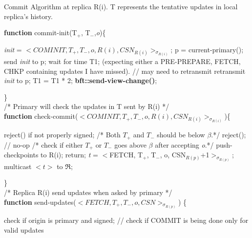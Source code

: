 \documentclass[twocolumn,10pt]{article}
\begin{document}
{\begin{algorithm}

\caption{Commit Algorithm at replica R(i). T represents the tentative updates in local
replica's history.}

\textbf{function} commit-init(T$_{+}$, T$_{-}$,\textit{o})\{
\begin{algorithmic}[1]
\STATE \textit{init} = 
$<COMINIT, T_{+}, T_{-}, o,R(i), CSN_{R(i)}>_{\sigma_{R(i)}}$;
\STATE p = current-primary();
\STATE send \textit{init} to p;
\STATE wait for time T1; (expecting either a PRE-PREPARE, FETCH, CHKP containing
updates I have missed). // may need to retransmit
\STATE retransmit \textit{init} to p;
\STATE T1 = T1 * 2;
\ENDFOR
{}
\STATE \textbf{bft::send-view-change()};
\ENDIF
\end{algorithmic}
\}\\
/* Primary will check the updates in T sent by R(i) */\\
\textbf{function} check-commit($<COMINIT, T_{+}, T_{-}, o, R(i), CSN_{R(i)}>_{\sigma_{R(i)}}$)\{
\begin{algorithmic}[1]
\STATE reject() if not properly signed;
\STATE /* Both $T_{+}$ and $T_{-}$ should be below $\beta$.*/
\STATE reject(); // no-op
\ENDIF
\STATE /* check if either $T_{+}$ or $T_{-}$ goes above $\beta$ after accepting \textit{o}.*/
\STATE push-checkpoints to R(i);
\STATE return;
\ENDIF
\STATE \textit{t} = $<$FETCH, T$_{+}$, T$_{-}$, o, CSN$_{R(p)}$+1$>_{\sigma_{R(p)}}$;
\STATE multicast $<t>$ to $\Re$;
\ENDIF
\end{algorithmic}
\}\\
/* Replica R(i) send updates when asked by primary */\\
\textbf{function} send-updates($<FETCH, T_+, T_-, o,
CSN >_{\sigma_{R(p)}}$) \{
\begin{algorithmic}[1]
\STATE check if origin is primary and signed;
\STATE // check if COMMIT is being done only for valid updates

\end{algorithmic}
\end{algorithm}}
\end{document}

